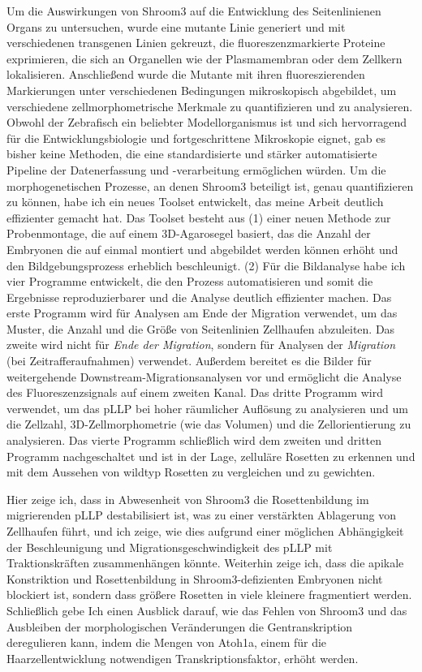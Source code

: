 \documentclass[11pt,singlespacinge,twoside]{reedthesis} %
\theoremstyle{definition}
\theoremstyle{definition}
\theoremstyle{definition}
\theoremstyle{remark}
\begin{document}
Um die Auswirkungen von Shroom3 auf die Entwicklung des Seitenlinienen Organs zu untersuchen, wurde eine mutante Linie generiert und mit verschiedenen transgenen Linien gekreuzt, die fluoreszenzmarkierte Proteine exprimieren, die sich an Organellen wie der Plasmamembran oder dem Zellkern lokalisieren. Anschließend wurde die Mutante mit ihren fluoreszierenden Markierungen unter verschiedenen Bedingungen mikroskopisch abgebildet, um verschiedene zellmorphometrische Merkmale zu quantifizieren und zu analysieren. Obwohl der Zebrafisch ein beliebter Modellorganismus ist und sich hervorragend für die Entwicklungsbiologie und fortgeschrittene Mikroskopie eignet, gab es bisher keine Methoden, die eine standardisierte und stärker automatisierte Pipeline der Datenerfassung und -verarbeitung ermöglichen würden. Um die morphogenetischen Prozesse, an denen Shroom3 beteiligt ist, genau quantifizieren zu können, habe ich ein neues Toolset entwickelt, das meine Arbeit deutlich effizienter gemacht hat. Das Toolset besteht aus (1) einer neuen Methode zur Probenmontage, die auf einem 3D-Agarosegel basiert, das die Anzahl der Embryonen die auf einmal montiert und abgebildet werden können erhöht und den Bildgebungsprozess erheblich beschleunigt. (2) Für die Bildanalyse habe ich vier Programme entwickelt, die den Prozess automatisieren und somit die Ergebnisse reproduzierbarer und die Analyse deutlich effizienter machen. Das erste Programm wird für Analysen am Ende der Migration verwendet, um das Muster, die Anzahl und die Größe von Seitenlinien Zellhaufen abzuleiten. Das zweite wird nicht für \emph{Ende der Migration}, sondern für Analysen der \emph{Migration} (bei Zeitrafferaufnahmen) verwendet. Außerdem bereitet es die Bilder für weitergehende Downstream-Migrationsanalysen vor und ermöglicht die Analyse des Fluoreszenzsignals auf einem zweiten Kanal. Das dritte Programm wird verwendet, um das pLLP bei hoher räumlicher Auflösung zu analysieren und um die Zellzahl, 3D-Zellmorphometrie (wie das Volumen) und die Zellorientierung zu analysieren. Das vierte Programm schließlich wird dem zweiten und dritten Programm nachgeschaltet und ist in der Lage, zelluläre Rosetten zu erkennen und mit dem Aussehen von wildtyp Rosetten zu vergleichen und zu gewichten.

Hier zeige ich, dass in Abwesenheit von Shroom3 die Rosettenbildung im migrierenden pLLP destabilisiert ist, was zu einer verstärkten Ablagerung von Zellhaufen führt, und ich zeige, wie dies aufgrund einer möglichen Abhängigkeit der Beschleunigung und Migrationsgeschwindigkeit des pLLP mit Traktionskräften zusammenhängen könnte. Weiterhin zeige ich, dass die apikale Konstriktion und Rosettenbildung in Shroom3-defizienten Embryonen nicht blockiert ist, sondern dass größere Rosetten in viele kleinere fragmentiert werden. Schließlich gebe Ich einen Ausblick darauf, wie das Fehlen von Shroom3 und das Ausbleiben der morphologischen Veränderungen die Gentranskription deregulieren kann, indem die Mengen von Atoh1a, einem für die Haarzellentwicklung notwendigen Transkriptionsfaktor, erhöht werden.
\end{document}
